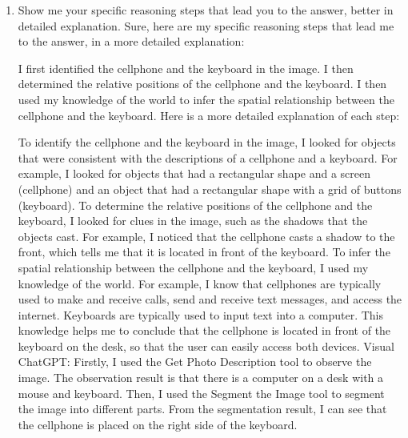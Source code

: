 \begin{enumerate}
    Here are some additional details about the spatial relationship between the cellphone and the keyboard:
    
    The cellphone is a small, portable electronic device that is used to make and receive calls, send and receive text messages, and access the internet.
    The keyboard is a device that is used to input text into a computer.
    The cellphone is located in front of the keyboard, meaning that it is closer to the user.
    The keyboard is located behind the cellphone, meaning that it is further from the user.
    Is there anything else I can help you with?
    \subitem Visual ChatGPT: The cellphone is placed on the right side of the keyboard.
    \item Show me your specific reasoning steps that lead you to the answer, better in detailed explanation.
    \subitem 
    Sure, here are my specific reasoning steps that lead me to the answer, in a more detailed explanation:
    
    I first identified the cellphone and the keyboard in the image.
    I then determined the relative positions of the cellphone and the keyboard.
    I then used my knowledge of the world to infer the spatial relationship between the cellphone and the keyboard.
    Here is a more detailed explanation of each step:
    
    To identify the cellphone and the keyboard in the image, I looked for objects that were consistent with the descriptions of a cellphone and a keyboard. For example, I looked for objects that had a rectangular shape and a screen (cellphone) and an object that had a rectangular shape with a grid of buttons (keyboard).
    To determine the relative positions of the cellphone and the keyboard, I looked for clues in the image, such as the shadows that the objects cast. For example, I noticed that the cellphone casts a shadow to the front, which tells me that it is located in front of the keyboard.
    To infer the spatial relationship between the cellphone and the keyboard, I used my knowledge of the world. For example, I know that cellphones are typically used to make and receive calls, send and receive text messages, and access the internet. Keyboards are typically used to input text into a computer. This knowledge helps me to conclude that the cellphone is located in front of the keyboard on the desk, so that the user can easily access both devices.
    \subitem Visual ChatGPT: Firstly, I used the Get Photo Description tool to observe the image. The observation result is that there is a computer on a desk with a mouse and keyboard. Then, I used the Segment the Image tool to segment the image into different parts. From the segmentation result, I can see that the cellphone is placed on the right side of the keyboard.
\end{enumerate}

